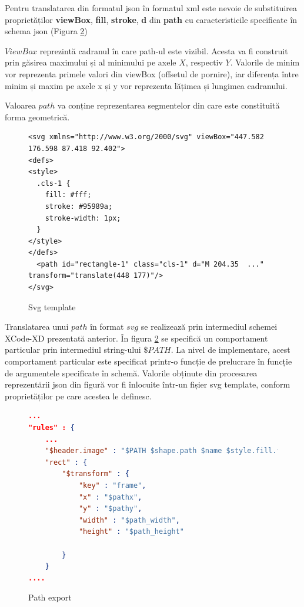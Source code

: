 Pentru translatarea din formatul json în formatul xml este nevoie de substituirea proprietăților \textbf{viewBox}, \textbf{fill}, \textbf{stroke}, \textbf{d} din \textbf{path} cu caracteristicile specificate în schema json (Figura \ref{fig:PathExport})


$ViewBox$ reprezintă cadranul în care path-ul este vizibil. Acesta va fi construit prin găsirea maximului și al minimului pe axele $X$, respectiv $Y$. Valorile de minim vor reprezenta primele valori din viewBox (offsetul de pornire), iar diferența între minim și maxim pe axele x și y vor reprezenta lățimea și lungimea cadranului.

Valoarea $path$ va conține reprezentarea segmentelor din care este constituită forma geometrică.

\begin{figure}
\lstset{language=XML}
\begin{lstlisting}
<svg xmlns="http://www.w3.org/2000/svg" viewBox="447.582 176.598 87.418 92.402">
<defs>
<style>
  .cls-1 {
    fill: #fff;
    stroke: #95989a;
    stroke-width: 1px;
  }
</style>
</defs>
  <path id="rectangle-1" class="cls-1" d="M 204.35  ..." transform="translate(448 177)"/>
</svg>
\end{lstlisting}
\caption{Svg template}\label{fig:svg}
\end{figure}

Translatarea unui $path$ în format $svg$ se realizează prin intermediul schemei XCode-XD prezentată anterior. În figura \ref{fig:PathExport} se specifică un comportament particular prin intermediul string-ului $\$PATH$. La nivel de implementare, acest comportament particular este specificat printr-o funcție de prelucrare în funcție de argumentele specificate în schemă. Valorile obținute din procesarea reprezentării json din figură vor fi înlocuite într-un fișier svg template, conform proprietăților pe care acestea le definesc. 

\begin{figure}[!htbp]
\begin{lstlisting}[language=json,firstnumber=1]
...
"rules" : {
    ...
    "$header.image" : "$PATH $shape.path $name $style.fill.type $style.fill.color.value $transform $style.stroke.color.value $style.stroke.width",
    "rect" : {
        "$transform" : {
            "key" : "frame",
            "x" : "$pathx",
            "y" : "$pathy",
            "width" : "$path_width",
            "height" : "$path_height"
                        
        }
    }
....
\end{lstlisting}
\caption{Path export} \label{fig:PathExport}
\end{figure}


